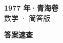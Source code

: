 \documentclass[zihao=-4, a4paper]{ctexart}
\begin{document}
\begin{center}
  {\Large\bfseries 1977 年·青海卷}\\[4pt]
  {\large 数学 · 简答版}
\end{center}
\medskip
{}

\clearpage
{}
\begin{center}{\Large\bfseries 答案速查}\end{center}
\medskip

\end{document}
